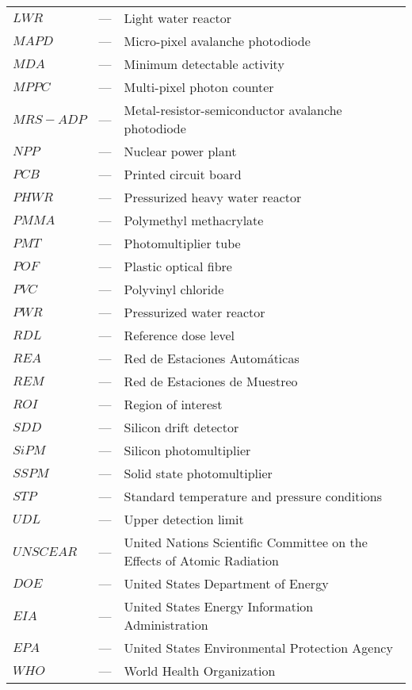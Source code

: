 \begin{longtable}{p{25mm} c p{120mm} }
$LWR$ & --- & Light water reactor\\
$MAPD$ & --- & Micro-pixel avalanche photodiode\\
$MDA$ & --- & Minimum detectable activity\\
$MPPC$ & --- & Multi-pixel photon counter\\
$MRS-ADP$ & --- & Metal-resistor-semiconductor avalanche photodiode\\
$NPP$ & --- & Nuclear power plant\\
$PCB$ & --- & Printed circuit board\\
$PHWR$ & --- & Pressurized heavy water reactor\\
$PMMA$ & --- & Polymethyl methacrylate\\
$PMT$ & --- & Photomultiplier tube\\
$POF$ & --- & Plastic optical fibre\\
$PVC$ & --- & Polyvinyl chloride\\
$PWR$ & --- & Pressurized water reactor\\
$RDL$ & --- & Reference dose level\\
$REA$ & --- & Red de Estaciones Automáticas\\
$REM$ & --- & Red de Estaciones de Muestreo\\
$ROI$ & --- & Region of interest\\
$SDD$ & --- & Silicon drift detector\\
$SiPM$ & --- & Silicon photomultiplier\\
$SSPM$ & --- & Solid state photomultiplier\\
$STP$ & --- & Standard temperature and pressure conditions\\
$UDL$ & --- & Upper detection limit\\
$UNSCEAR$ & --- & United Nations Scientific Committee on the Effects
\newline
of Atomic Radiation\\
$DOE$ & --- & United States Department of Energy\\
$EIA$ & --- & United States Energy Information Administration\\
$EPA$ & --- & United States Environmental Protection Agency\\
$WHO$ & --- & World Health Organization\\


\end{longtable}

